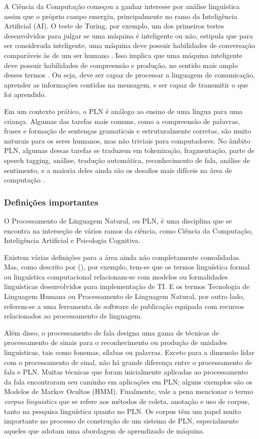 \documentclass[
	12pt,				%
	openright,			%
	oneside,			%
	a4paper,			%
	english,			%
	spanish,			%
	brazil				%
	]{abntex2}
\begin{document}
	A Ciência da Computação começou a ganhar interesse por análise linguística assim que o próprio campo emergiu, principalmente no ramo da Inteligência Artificial (AI). O teste de Turing, por exemplo, um dos primeiros testes desenvolvidos para julgar se uma máquina é inteligente ou não, estipula que para ser considerada inteligente, uma máquina deve possuir habilidades de conversação comparáveis às de um ser humano \cite{turing}. Isso implica que uma máquina inteligente deve possuir habilidades de compreensão e produção, no sentido mais amplo desses termos \cite{book_natural_lang}. Ou seja, deve ser capaz de processar a linguagem de comunicação, aprender as informações contidas na mensagem, e ser capaz de transmitir o que foi aprendido. 	
	
	Em um contexto prático, o PLN é análogo ao ensino de uma língua para uma criança. Algumas das tarefas mais comuns, como a compreensão de palavras, frases e formação de sentenças gramaticais e estruturalmente corretas, são muito naturais para os seres humanos, mas não triviais para computadores. No âmbito PLN, algumas dessas tarefas se traduzem em tokenização, fragmentação, parte de speech tagging, análise, tradução automática, reconhecimento de fala, análise de sentimento, e a maioria deles ainda são os desafios mais difíceis na área de computação \cite{book_natlang_python}.
		
	\subsubsection*{Definições importantes}
	O Processamento de Linguagem Natural, ou PLN, é uma disciplina que se encontra na interseção de vários ramos da ciência, como Ciência da Computação, Inteligência Artificial e Psicologia Cognitiva. 
	
Existem várias definições para a área ainda não completamente consolidadas. Mas, como descrito por   (\citeyear{book_natural_lang}), por exemplo, tem-se que os termos linguística formal ou linguística computacional relacionam-se com modelos ou formalidades linguísticas desenvolvidos para implementação de TI. E os termos Tecnologia de Linguagem Humana ou Processamento de Linguagem Natural, por outro lado, referem-se a uma ferramenta de software de publicação equipada com recursos relacionados ao processamento de linguagem. 

Além disso, o processamento de fala designa uma gama de técnicas de processamento de sinais para o reconhecimento ou produção de unidades linguísticas, tais como fonemas, sílabas ou palavras. Exceto para a dimensão lidar com o processamento de sinal, não há grande diferença entre o processamento de fala e PLN. Muitas técnicas que foram inicialmente aplicadas ao processamento da fala encontraram seu caminho em aplicações em PLN; alguns exemplos são os Modelos de Markov Ocultos (HMM). Finalmente, vale a pena mencionar o termo \textit{corpus linguistics}  que se refere aos métodos de coleta, anotação e uso de corpus, tanto na pesquisa linguística quanto no PLN. Os corpus têm um papel muito importante no processo de construção de um sistema de PLN, especialmente aqueles que adotam uma abordagem de aprendizado de máquina.
\end{document}
